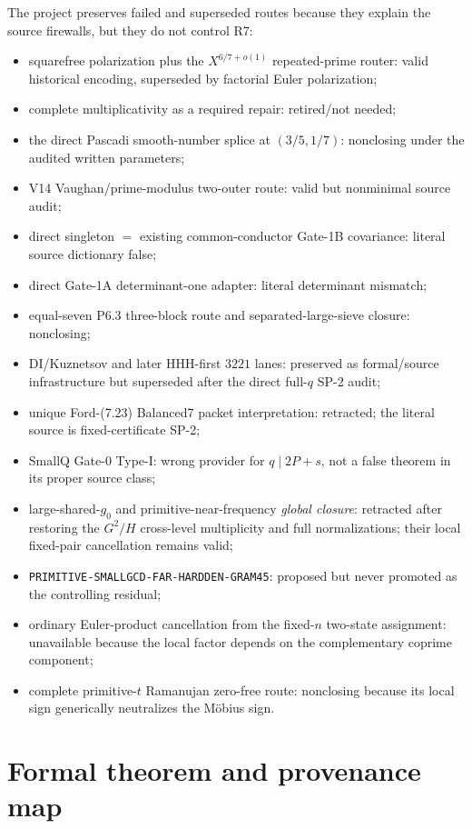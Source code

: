 \documentclass[11pt]{article}
\theoremstyle{definition}
\newcommand{\1}{\mathbf 1}
\begin{document}
The project preserves failed and superseded routes because they explain the source
firewalls, but they do not control R7:
\begin{itemize}[leftmargin=1.6em]
\item squarefree polarization plus the $X^{6/7+o(1)}$ repeated-prime router:
  valid historical encoding, superseded by factorial Euler polarization;
\item complete multiplicativity as a required repair: retired/not needed;
\item the direct Pascadi smooth-number splice at $(3/5,1/7)$: nonclosing under the audited
  written parameters;
\item V14 Vaughan/prime-modulus two-outer route: valid but nonminimal source audit;
\item direct singleton $=$ existing common-conductor Gate-1B covariance: literal source
  dictionary false;
\item direct Gate-1A determinant-one adapter: literal determinant mismatch;
\item equal-seven P6.3 three-block route and separated-large-sieve closure: nonclosing;
\item DI/Kuznetsov and later HHH-first $3221$ lanes: preserved as formal/source
  infrastructure but superseded after the direct full-$q$ SP-2 audit;
\item unique Ford-(7.23) Balanced7 packet interpretation: retracted; the literal source is
  fixed-certificate SP-2;
\item SmallQ Gate-0 Type-I: wrong provider for $q\mid2P+s$, not a false theorem in its
  proper source class;
\item large-shared-$g_0$ and primitive-near-frequency \emph{global closure}: retracted
  after restoring the $G^2/H$ cross-level multiplicity and full normalizations; their local
  fixed-pair cancellation remains valid;
\item \texttt{PRIMITIVE-SMALLGCD-FAR-HARDDEN-GRAM45}: proposed but never promoted as the
  controlling residual;
\item ordinary Euler-product cancellation from the fixed-$n$ two-state assignment:
  unavailable because the local factor depends on the complementary coprime component;
\item complete primitive-$t$ Ramanujan zero-free route:
  nonclosing because its local sign generically neutralizes the M\"obius sign.
\end{itemize}


\section{Formal theorem and provenance map}
\end{document}

